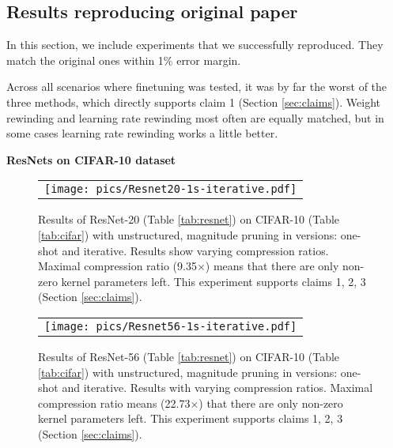 \subsection{Results reproducing original paper}

In this section, we include experiments that we successfully reproduced.
They match the original ones within 1\% error margin.

Across all scenarios where finetuning was tested, it was by far the worst of the three methods, which directly supports claim 1 (Section \ref{sec:claims}). Weight rewinding and learning rate rewinding most often are equally matched, but in some cases learning rate rewinding works a little better.

\textbf{ResNets on CIFAR-10 dataset}
\nopagebreak

\begin{figure}[H]
\centering
\setlength{\tabcolsep}{0pt}
\begin{tabular}{c}
\texttt{[image: pics/Resnet20-1s-iterative.pdf]}
\end{tabular}
\caption{Results of ResNet-20 (Table \ref{tab:resnet}) on CIFAR-10 (Table \ref{tab:cifar}) with unstructured, magnitude pruning in versions: one-shot and iterative. Results show varying compression ratios. Maximal compression ratio (9.35$\times$) means that there are only  non-zero kernel parameters left. This experiment supports claims 1, 2, 3 (Section \ref{sec:claims}).}
\label{fig:resnet20-1}
\end{figure}

\begin{figure}[H]
\setlength{\tabcolsep}{0pt}
\centering
    \begin{tabular}{c}
      \texttt{[image: pics/Resnet56-1s-iterative.pdf]}
    \end{tabular}
\caption{Results of ResNet-56 (Table \ref{tab:resnet}) on CIFAR-10 (Table \ref{tab:cifar}) with unstructured, magnitude pruning in versions: one-shot and iterative. Results with varying compression ratios. Maximal compression ratio means (22.73$\times$) that there are only  non-zero kernel parameters left. This experiment supports claims 1, 2, 3 (Section \ref{sec:claims}).}
\label{fig:resnet56}
\end{figure}

